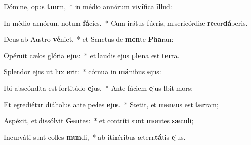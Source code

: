 \item Dómine, opus \textbf{tu}um,~* in médio annórum vi\textbf{ví}fica \textbf{il}lud:
\item In médio annórum notum \textbf{fá}cies.~* Cum irátus fúeris, misericórdiæ \textbf{re}cor\textbf{dá}beris.
\item Deus ab Austro \textbf{vé}niet,~* et Sanctus de \textbf{mon}te \textbf{Pha}ran:
\item Opéruit cælos glória \textbf{e}jus:~* et laudis ejus \textbf{ple}na est \textbf{ter}ra.
\item Splendor ejus ut lux \textbf{e}rit:~* córnua in \textbf{má}nibus \textbf{e}jus:
\item Ibi abscóndita est fortitúdo \textbf{e}jus.~* Ante fáciem \textbf{e}jus \textbf{i}bit mors:
\item Et egrediétur diábolus ante pedes \textbf{e}jus.~* Stetit, et \textbf{men}sus est \textbf{ter}ram;
\item Aspéxit, et dissólvit \textbf{Gen}tes:~* et contríti sunt \textbf{mon}tes \textbf{sæ}culi;
\item Incurváti sunt colles \textbf{mun}di,~* ab itinéribus ætern\textbf{tá}tis \textbf{e}jus.
